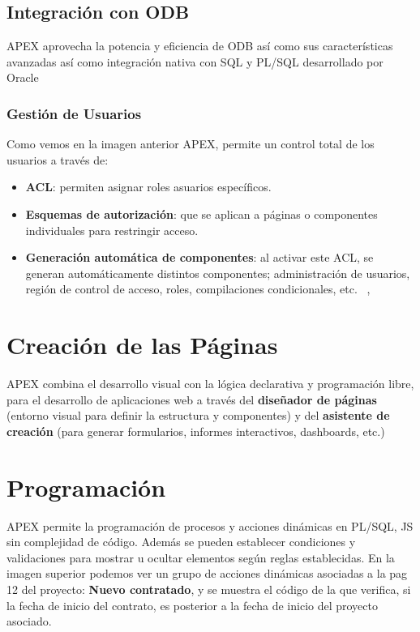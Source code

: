 \subsection{Integración con \acrfull{ODB}}
\acrshort{APEX} aprovecha la potencia y eficiencia de \acrshort{ODB} así como sus características avanzadas así como integración nativa con \acrshort{SQL} y \acrshort{PL/SQL} desarrollado por Oracle ~\cite{OracleAPEXSQL}
\subsubsection{Gestión de Usuarios}
Como vemos en la imagen anterior \acrshort{APEX}, permite un control total de los usuarios a través de:
\begin{itemize}
	\item \textbf{\acrfull{ACL}}: permiten asignar roles asuarios específicos.
	\item \textbf{Esquemas de autorización}: que se aplican a páginas o componentes individuales para restringir acceso.
	\item \textbf{Generación automática de componentes}: al activar este \acrshort{ACL}, se generan automáticamente distintos componentes; administración de usuarios, región de control de acceso, roles, compilaciones condicionales, etc. ~\cite{OracleAPEXApp}, \cite{OracleAPEXAdministration}
\end{itemize}
\section{Creación de las Páginas}
\acrshort{APEX} combina el desarrollo visual con la lógica declarativa y programación libre, para el desarrollo de aplicaciones web a través del \textbf{diseñador de páginas} (entorno visual para definir la estructura y componentes) y del \textbf{asistente de creación} (para generar formularios, informes interactivos, dashboards, etc.)
\section{Programación}
\acrshort{APEX} permite la programación de procesos y acciones dinámicas en \acrshort{PL/SQL}, \acrshort{JS} sin complejidad de código.
Además se pueden establecer condiciones y validaciones para mostrar u ocultar elementos según reglas establecidas.
En la imagen superior podemos ver un grupo de acciones dinámicas asociadas a la pag 12 del proyecto: \textbf{Nuevo contratado}, y se muestra el código de la que verifica, si la fecha de inicio del contrato, es posterior a la fecha de inicio del proyecto asociado.
